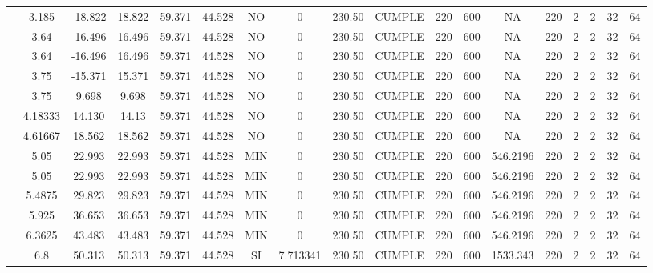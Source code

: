 \begin{table}[H]
{\begin{tabular}{|c|c|c|c|c|c|c|c|c|c|c|c|c|c|c|c|c|c|}
\cline{2-18}          & 3.185 & -18.822 & 18.822 & 59.371 & 44.528 & NO    & 0     & 230.50 & CUMPLE & 220   & 600   & NA    & 220   & 2     & 2     & 32    & 64 \bigstrut\\
\cline{2-18}          & 3.64  & -16.496 & 16.496 & 59.371 & 44.528 & NO    & 0     & 230.50 & CUMPLE & 220   & 600   & NA    & 220   & 2     & 2     & 32    & 64 \bigstrut\\
\cline{2-18}          & 3.64  & -16.496 & 16.496 & 59.371 & 44.528 & NO    & 0     & 230.50 & CUMPLE & 220   & 600   & NA    & 220   & 2     & 2     & 32    & 64 \bigstrut\\
\cline{2-18}          & 3.75  & -15.371 & 15.371 & 59.371 & 44.528 & NO    & 0     & 230.50 & CUMPLE & 220   & 600   & NA    & 220   & 2     & 2     & 32    & 64 \bigstrut\\
\cline{2-18}          & 3.75  & 9.698 & 9.698 & 59.371 & 44.528 & NO    & 0     & 230.50 & CUMPLE & 220   & 600   & NA    & 220   & 2     & 2     & 32    & 64 \bigstrut\\
\cline{2-18}          & 4.18333 & 14.130 & 14.13 & 59.371 & 44.528 & NO    & 0     & 230.50 & CUMPLE & 220   & 600   & NA    & 220   & 2     & 2     & 32    & 64 \bigstrut\\
\cline{2-18}          & 4.61667 & 18.562 & 18.562 & 59.371 & 44.528 & NO    & 0     & 230.50 & CUMPLE & 220   & 600   & NA    & 220   & 2     & 2     & 32    & 64 \bigstrut\\
\cline{2-18}          & 5.05  & 22.993 & 22.993 & 59.371 & 44.528 & MIN   & 0     & 230.50 & CUMPLE & 220   & 600   & 546.2196 & 220   & 2     & 2     & 32    & 64 \bigstrut\\
\cline{2-18}          & 5.05  & 22.993 & 22.993 & 59.371 & 44.528 & MIN   & 0     & 230.50 & CUMPLE & 220   & 600   & 546.2196 & 220   & 2     & 2     & 32    & 64 \bigstrut\\
\cline{2-18}          & 5.4875 & 29.823 & 29.823 & 59.371 & 44.528 & MIN   & 0     & 230.50 & CUMPLE & 220   & 600   & 546.2196 & 220   & 2     & 2     & 32    & 64 \bigstrut\\
\cline{2-18}          & 5.925 & 36.653 & 36.653 & 59.371 & 44.528 & MIN   & 0     & 230.50 & CUMPLE & 220   & 600   & 546.2196 & 220   & 2     & 2     & 32    & 64 \bigstrut\\
\cline{2-18}          & 6.3625 & 43.483 & 43.483 & 59.371 & 44.528 & MIN   & 0     & 230.50 & CUMPLE & 220   & 600   & 546.2196 & 220   & 2     & 2     & 32    & 64 \bigstrut\\
\cline{2-18}          & 6.8   & 50.313 & 50.313 & 59.371 & 44.528 & SI    & 7.713341 & 230.50 & CUMPLE & 220   & 600   & 1533.343 & 220   & 2     & 2     & 32    & 64 \bigstrut\\

\end{tabular}}
\end{table}
